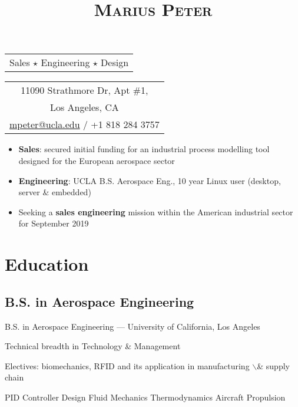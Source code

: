 \documentclass[11pt]{article}
\date{}
\title{\textsc{Marius Peter}}
\begin{document}
\maketitle
\begin{center}
\begin{tabular}{l}
Sales \(\star\) Engineering \(\star\) Design\\
\end{tabular}

\end{center}

\begin{center}
\begin{tabular}{c}
11090 Strathmore Dr, Apt \#1,\\
Los Angeles, CA\\
\href{mailto:mpeter@ucla.edu}{mpeter@ucla.edu} / +1 818 284 3757\\
\end{tabular}

\end{center}

\begin{itemize}
\item \textbf{Sales}: secured initial funding for an industrial process modelling tool
designed for the European aerospace sector
\item \textbf{Engineering}: UCLA B.S. Aerospace Eng., 10 year Linux user (desktop,
server \& embedded)
\item Seeking a \textbf{sales engineering} mission within the American industrial
sector for September 2019
\end{itemize}

\section*{Education}
\label{sec:org85bff6e}

\subsection*{B.S. in Aerospace Engineering}
\label{sec:org06c1878}
\begin{description}
\item[{2014--2019}] B.S. in Aerospace Engineering --- University of California, Los Angeles
\item Technical breadth in Technology \& Management
\item Electives: biomechanics, RFID and its application in manufacturing $\backslash$& supply chain
\item PID Controller Design \textbullet
Fluid Mechanics \textbullet
Thermodynamics \textbullet
Aircraft Propulsion \textbullet
\end{description}
\end{document}
